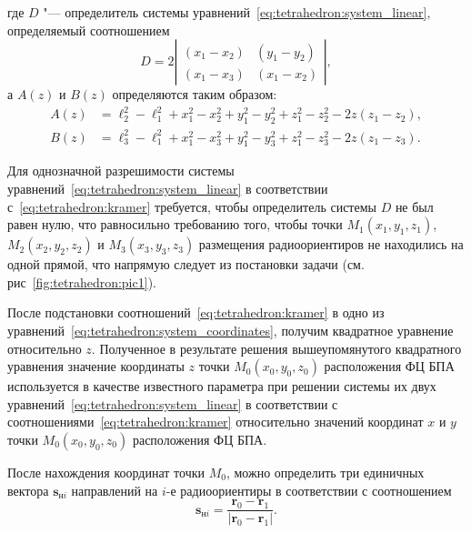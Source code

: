\documentclass[../main.tex]{subfiles}
\begin{document}
где $D$ "--- определитель системы уравнений~\eqref{eq:tetrahedron:system_linear}, определяемый соотношением
\begin{equation*}
  D = 2 \left|\begin{matrix}
    \left(x_1 - x_2\right) & \left(y_1 - y_2\right) \\
    \left(x_1 - x_3\right) & \left(x_1 - x_2\right)
  \end{matrix}\right|,
\end{equation*}
а $A\left(z\right)$ и $B\left(z\right)$ определяются таким образом:
\begin{align*}
  A\left(z\right) &= \ell_2^2 - \ell_1^2 + x_1^2 - x_2^2 + y_1^2 - y_2^2 + z_1^2 - z_2^2 - 2z\left(z_1 - z_2\right), \\
  B\left(z\right) &= \ell_3^2 - \ell_1^2 + x_1^2 - x_3^2 + y_1^2 - y_3^2 + z_1^2 - z_3^2 - 2z\left(z_1 - z_3\right).
\end{align*}

Для однозначной разрешимости системы уравнений~\eqref{eq:tetrahedron:system_linear} в соответствии с~\eqref{eq:tetrahedron:kramer} требуется, чтобы определитель системы $D$ не был равен нулю, что равносильно требованию того, чтобы точки $M_1\left(x_1, y_1, z_1\right)$, $M_2\left(x_2, y_2, z_2\right)$ и $M_3\left(x_3, y_3, z_3\right)$ размещения радиоориентиров не находились на одной прямой, что напрямую следует из постановки задачи (см. рис~\ref{fig:tetrahedron:pic1}).

После подстановки соотношений~\eqref{eq:tetrahedron:kramer} в одно из уравнений~\eqref{eq:tetrahedron:system_coordinates}, получим квадратное уравнение относительно $z$. Полученное в результате решения вышеупомянутого квадратного уравнения значение координаты $z$ точки $M_0\left(x_0, y_0, z_0\right)$ расположения ФЦ БПА используется в качестве известного параметра при решении системы их двух уравнений~\eqref{eq:tetrahedron:system_linear} в соответствии с соотношениями~\eqref{eq:tetrahedron:kramer} относительно значений координат $x$ и $y$ точки $M_0\left(x_0, y_0, z_0\right)$ расположения ФЦ БПА.

После нахождения координат точки $M_0$, можно определить три единичных вектора $\mathbf{s}_{\text{н}i}$ направлений на $i$-е радиоориентиры в соответствии с соотношением
\begin{equation} \label{eq:tetrahedron:s_vectors}
    \mathbf{s}_{\text{н}i} = \frac{\mathbf{r}_0 - \mathbf{r}_1}{|\mathbf{r}_0 - \mathbf{r}_1|}.
\end{equation}
\end{document}
